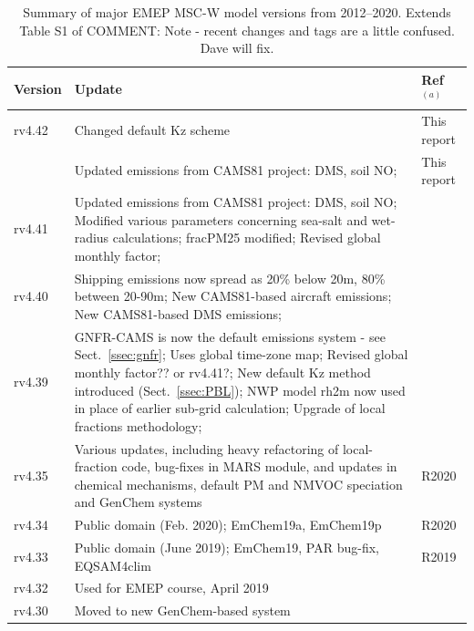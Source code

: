 \begin{table}
\begin{footnotesize}
\caption{Summary of major EMEP MSC-W model versions from 2012--2020.
Extends Table S1 of \citealt{Simpson_et_al:EMEP}
  COMMENT: Note - recent changes and tags are a little confused. Dave will fix.
}
\label{tab:Updates}
\centering
\begin{tabular}{lp{11cm}l}
\hline
Version & Update                                        & Ref$^{(a)}$   \\
\hline
rv4.42  & Changed default Kz scheme &  This report        \\
        & Updated emissions from CAMS81 project: DMS, soil NO;  &  This report        \\
rv4.41  & Updated emissions from CAMS81 project: DMS, soil NO; %
          Modified various parameters concerning sea-salt and wet-radius calculations; %
   fracPM25 modified;
          Revised global monthly factor;  %
        & \\
rv4.40  & Shipping emissions now spread as 20\% below 20m, 80\% between 20-90m;  
          New CAMS81-based aircraft emissions; %
          New CAMS81-based DMS emissions; %
        & \\
rv4.39 &
  GNFR-CAMS is now the default emissions system - see Sect.~\ref{ssec:gnfr};  %
          Uses global time-zone map;   %
          Revised global monthly factor?? or rv4.41?;  %
          New default Kz method introduced (Sect.~\ref{ssec:PBL});
          NWP model rh2m now used in place of earlier sub-grid calculation; %
          Upgrade of local fractions methodology;  %
        & \\
rv4.35  & Various updates, including heavy   
          refactoring of local-fraction code, bug-fixes in MARS module,
          and updates in chemical mechanisms, default PM and NMVOC speciation and
          GenChem systems     & R2020            \\
rv4.34  & Public domain (Feb. 2020); EmChem19a, EmChem19p      & R2020            \\
rv4.33  & Public domain (June 2019);
         EmChem19, PAR bug-fix, EQSAM4clim    & R2019            \\
rv4.32  & Used for EMEP course, April 2019    &    \\
rv4.30  & Moved to new GenChem-based system  &   \\

\end{tabular}
\end{footnotesize}
\end{table}
